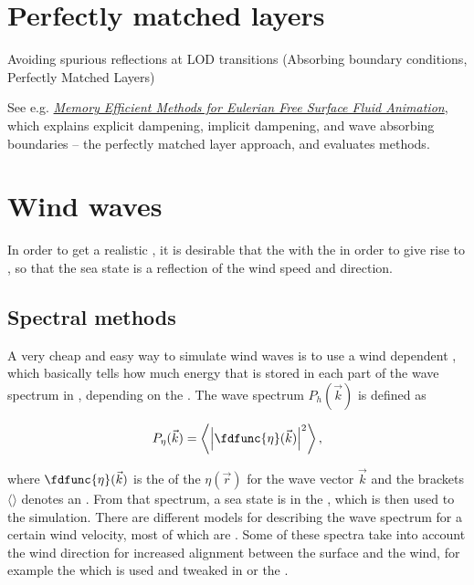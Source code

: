 

\section{Perfectly matched layers}

Avoiding spurious reflections at LOD transitions (Absorbing boundary conditions, Perfectly Matched Layers)

See e.g. \textit{\href{http://liu.diva-portal.org/smash/get/diva2:359805/FULLTEXT01}{Memory Efficient Methods for Eulerian Free Surface Fluid Animation}}, which explains explicit dampening, implicit dampening, and wave absorbing boundaries -- the perfectly matched layer approach, and evaluates methods.

\section{Wind waves}

In order to get a realistic , it is desirable that the  \interacts with the \wind in order to give rise to , so that the sea state is a reflection of the wind speed and direction.

\subsection{Spectral methods}

A very cheap and easy way to simulate wind waves is to use a wind dependent , which basically tells how much energy that is stored in each part of the wave spectrum in \average, depending on the . The wave spectrum $P_h(\vec{k})$ is defined as

\begin{equation} \label{eq:wave_spectrum}
P_{\eta}(\vec{k}) = \left\langle \left|\fdfunc{\eta}(\vec{k})\right|^2 \right\rangle,
\end{equation}

where $\fdfunc{\eta}(\vec{k})$ is the  of the  $\eta(\vec{r})$ for the wave vector $\vec{k}$ and the brackets $\langle\rangle$ denotes an . From that spectrum, a \random sea state is \generated in the , which is then used to \initialize the simulation. There are different models for describing the wave spectrum for a certain wind velocity, most of which are \empirical. Some of these spectra take into account the wind direction for increased alignment between the surface and the wind, for example the  which is used and tweaked in \citep{temp} or the .

